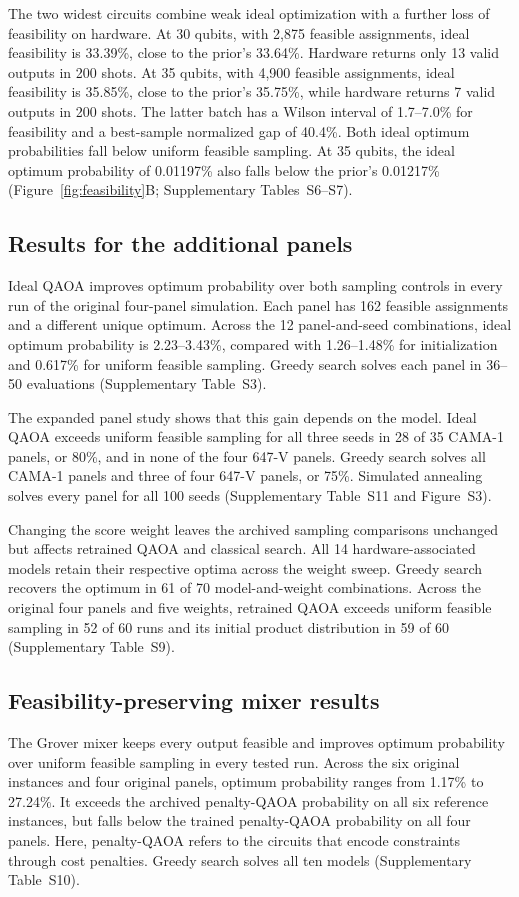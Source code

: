 \documentclass[utf8]{FrontiersinHarvard}
\begin{document}
The two widest circuits combine weak ideal optimization with a further loss of feasibility on hardware. At 30 qubits, with 2,875 feasible assignments, ideal feasibility is 33.39\%, close to the prior's 33.64\%. Hardware returns only 13 valid outputs in 200 shots. At 35 qubits, with 4,900 feasible assignments, ideal feasibility is 35.85\%, close to the prior's 35.75\%, while hardware returns 7 valid outputs in 200 shots. The latter batch has a Wilson interval of 1.7--7.0\% for feasibility and a best-sample normalized gap of 40.4\%. Both ideal optimum probabilities fall below uniform feasible sampling. At 35 qubits, the ideal optimum probability of 0.01197\% also falls below the prior's 0.01217\% (Figure~\ref{fig:feasibility}B; Supplementary Tables~S6--S7).

\subsection{Results for the additional panels}
Ideal QAOA improves optimum probability over both sampling controls in every run of the original four-panel simulation. Each panel has 162 feasible assignments and a different unique optimum. Across the 12 panel-and-seed combinations, ideal optimum probability is 2.23--3.43\%, compared with 1.26--1.48\% for initialization and 0.617\% for uniform feasible sampling. Greedy search solves each panel in 36--50 evaluations (Supplementary Table~S3).

The expanded panel study shows that this gain depends on the model. Ideal QAOA exceeds uniform feasible sampling for all three seeds in 28 of 35 CAMA-1 panels, or 80\%, and in none of the four 647-V panels. Greedy search solves all CAMA-1 panels and three of four 647-V panels, or 75\%. Simulated annealing solves every panel for all 100 seeds (Supplementary Table~S11 and Figure~S3).

Changing the score weight leaves the archived sampling comparisons unchanged but affects retrained QAOA and classical search. All 14 hardware-associated models retain their respective optima across the weight sweep. Greedy search recovers the optimum in 61 of 70 model-and-weight combinations. Across the original four panels and five weights, retrained QAOA exceeds uniform feasible sampling in 52 of 60 runs and its initial product distribution in 59 of 60 (Supplementary Table~S9).

\subsection{Feasibility-preserving mixer results}
The Grover mixer keeps every output feasible and improves optimum probability over uniform feasible sampling in every tested run. Across the six original instances and four original panels, optimum probability ranges from 1.17\% to 27.24\%. It exceeds the archived penalty-QAOA probability on all six reference instances, but falls below the trained penalty-QAOA probability on all four panels. Here, penalty-QAOA refers to the circuits that encode constraints through cost penalties. Greedy search solves all ten models (Supplementary Table~S10).
\end{document}
